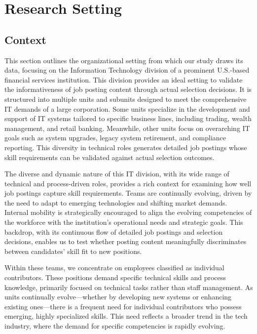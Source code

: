 

\section{Research Setting}\label{sec:research_setting}


\subsection{Context}


This section outlines the organizational setting from which our study draws its data, focusing on the 
Information Technology division of a prominent U.S.-based financial services institution. This division 
provides an ideal setting to validate the informativeness of job posting content through actual selection 
decisions. It is structured into multiple units and subunits designed to meet the comprehensive IT demands 
of a large corporation. Some units specialize in the development and support of IT systems tailored to 
specific business lines, including trading, wealth management, and retail banking. Meanwhile, other 
units focus on overarching IT goals such as system upgrades, legacy system retirement, and compliance 
reporting. This diversity in technical roles generates detailed job postings whose skill requirements 
can be validated against actual selection outcomes.



The diverse and dynamic nature of this IT division, with its wide range of technical and process-driven roles, 
provides a rich context for examining how well job postings capture skill requirements. Teams are continually 
evolving, driven by the need to adapt to emerging technologies and shifting market demands. Internal mobility 
is strategically encouraged to align the evolving competencies of the workforce with the institution's 
operational needs and strategic goals. This backdrop, with its continuous flow of detailed job postings and 
selection decisions, enables us to test whether posting content meaningfully discriminates between 
candidates' skill fit to new positions.


Within these teams, we concentrate on employees classified as individual contributors. These positions demand 
specific technical skills and process knowledge, primarily focused on technical tasks rather than staff management. 
As units continually evolve—whether by developing new systems or enhancing existing ones—there is a frequent need 
for individual contributors who possess emerging, highly specialized skills. This need reflects a broader trend in 
the tech industry, where the demand for specific competencies is rapidly evolving.

